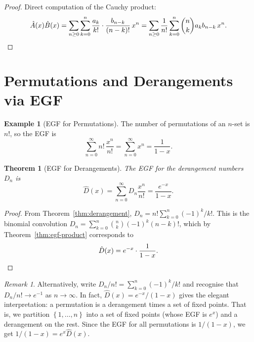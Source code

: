 \documentclass[12pt,a4paper,openany]{book}
\theoremstyle{definition}
\newtheorem{example}[definition]{Example}
\theoremstyle{plain}
\newtheorem{theorem}[definition]{Theorem}
\theoremstyle{remark}
\newtheorem{remark}[definition]{Remark}
\newcommand{\set}[1]{\left\{#1\right\}}
\begin{document}
\begin{proof}
Direct computation of the Cauchy product:
\[
  \hat{A}(x)\hat{B}(x)
  = \sum_{n\ge 0}\sum_{k=0}^{n}\frac{a_k}{k!}\cdot\frac{b_{n-k}}{(n-k)!}\,x^n
  = \sum_{n\ge 0}\frac{1}{n!}\sum_{k=0}^{n}\binom{n}{k}a_k b_{n-k}\,x^n.
  \qedhere
\]
\end{proof}



\section{Permutations and Derangements via EGF}\label{sec:egf-permutations}

\begin{example}[EGF for Permutations]\label{ex:egf-permutations}
The number of permutations of an $n$-set is $n!$, so the EGF is
\[
  \sum_{n=0}^{\infty}n!\,\frac{x^n}{n!}
  = \sum_{n=0}^{\infty}x^n = \frac{1}{1-x}.
\]
\end{example}

\begin{theorem}[EGF for Derangements]\label{thm:derangement-egf}
The EGF for the derangement numbers $D_n$ is
\[
  \hat{D}(x) = \sum_{n=0}^{\infty}D_n\frac{x^n}{n!}
  = \frac{e^{-x}}{1-x}.
\]
\end{theorem}

\begin{proof}
From Theorem~\ref{thm:derangement}, $D_n = n!\sum_{k=0}^n(-1)^k/k!$.
This is the binomial convolution $D_n = \sum_{k=0}^n \binom{n}{k}(-1)^k
(n-k)!$, which by Theorem~\ref{thm:egf-product} corresponds to
\[
  \hat{D}(x) = e^{-x}\cdot\frac{1}{1-x}. \qedhere
\]
\end{proof}

\begin{remark}\label{rem:derangement-egf-alt}
Alternatively, write $D_n/n! = \sum_{k=0}^n(-1)^k/k!$ and recognise
that $D_n/n! \to e^{-1}$ as $n \to \infty$.  In fact,
$\hat{D}(x) = e^{-x}/(1-x)$ gives the elegant interpretation: a
permutation is a derangement times a set of fixed points.  That is,
we partition $\set{1,\dots,n}$ into a set of fixed points (whose EGF
is $e^x$) and a derangement on the rest.  Since the EGF for all
permutations is $1/(1-x)$, we get $1/(1-x) = e^x \hat{D}(x)$.
\end{remark}
\end{document}
